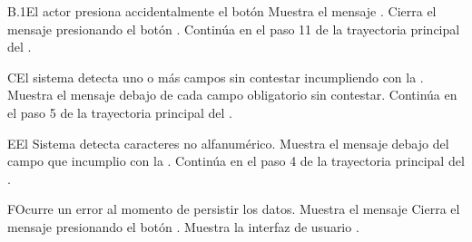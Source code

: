 \begin{UCtrayectoriaA}{B.1}{El actor presiona accidentalmente el botón }
    \UCpaso Muestra el mensaje .
    \UCpaso[\UCactor] Cierra el mensaje presionando el botón .
    \UCpaso Continúa en el paso 11 de la trayectoria principal del .
\end{UCtrayectoriaA}
\begin{UCtrayectoriaA}{C}{El sistema detecta uno o más campos sin contestar incumpliendo con la .}
    \UCpaso Muestra el mensaje   debajo de cada campo obligatorio sin contestar.
    \UCpaso Continúa en el paso 5 de la trayectoria principal del .
\end{UCtrayectoriaA}
\begin{UCtrayectoriaA}{E}{El Sistema detecta caracteres no alfanumérico.}
    \UCpaso Muestra el mensaje  debajo del campo que incumplio con la .
    \UCpaso Continúa en el paso 4 de la trayectoria principal del .
\end{UCtrayectoriaA}
\begin{UCtrayectoriaA}{F}{Ocurre un error al momento de persistir los datos.}
    \UCpaso Muestra el mensaje 
    \UCpaso[\UCactor] Cierra el mensaje presionando el botón .
    \UCpaso Muestra la interfaz de usuario .
\end{UCtrayectoriaA}
